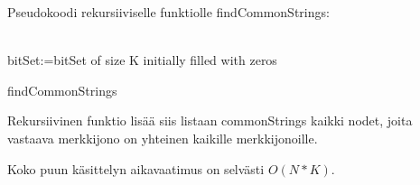 \documentclass{article}
\begin{document}
    \newpage
    
    Pseudokoodi rekursiiviselle funktiolle findCommonStrings:
    \\ \\
    \begin{algorithm}[H]
        bitSet:=bitSet of size K initially filled with zeros\;
        \caption{findCommonStrings}
    \end{algorithm}

    \medskip \medskip
    Rekursiivinen funktio lisää siis listaan commonStrings kaikki nodet, joita vastaava merkkijono on yhteinen kaikille merkkijonoille.
    
    Koko puun käsittelyn aikavaatimus on selvästi $O(N*K)$.
    
    
    
\end{document}
